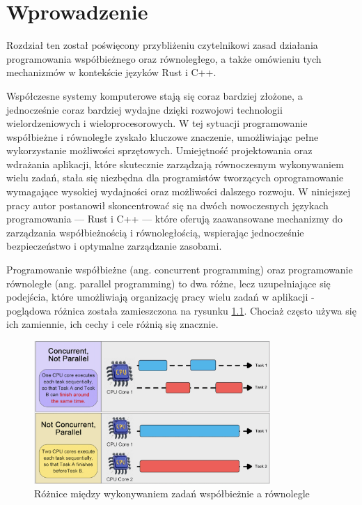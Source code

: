 \chapter{Wprowadzenie}
Rozdział ten został poświęcony przybliżeniu czytelnikowi zasad działania programowania współbieżnego oraz równoległego, a także omówieniu tych mechanizmów w kontekście języków Rust i C++.

Współczesne systemy komputerowe stają się coraz bardziej złożone, a jednocześnie coraz bardziej wydajne dzięki rozwojowi technologii wielordzeniowych i wieloprocesorowych. W tej sytuacji programowanie współbieżne i równoległe zyskało kluczowe znaczenie, umożliwiając pełne wykorzystanie możliwości sprzętowych. Umiejętność projektowania oraz wdrażania aplikacji, które skutecznie zarządzają równoczesnym wykonywaniem wielu zadań, stała się niezbędna dla programistów tworzących oprogramowanie wymagające wysokiej wydajności oraz możliwości dalszego rozwoju. W niniejszej pracy autor postanowił skoncentrować się na dwóch nowoczesnych językach programowania — Rust i C++ — które oferują zaawansowane mechanizmy do zarządzania współbieżnością i równoległością, wspierając jednocześnie bezpieczeństwo i optymalne zarządzanie zasobami.

Programowanie współbieżne (ang. concurrent programming) oraz programowanie równoległe (ang. parallel programming) to dwa różne, lecz uzupełniające się podejścia, które umożliwiają organizację pracy wielu zadań w aplikacji - poglądowa różnica została zamieszczona na rysunku \ref{fig:concurrent_vs_parallel}. Chociaż często używa się ich zamiennie, ich cechy i cele różnią się znacznie.

\begin{figure}[H]
    \centering
    \includegraphics[width=0.8\textwidth]{images/ConcurrentParallelCompare.png}
    \caption{Różnice między wykonywaniem zadań współbieżnie a równolegle \cite{bytebytegoEP108Design}}
    \label{fig:concurrent_vs_parallel}
\end{figure}



